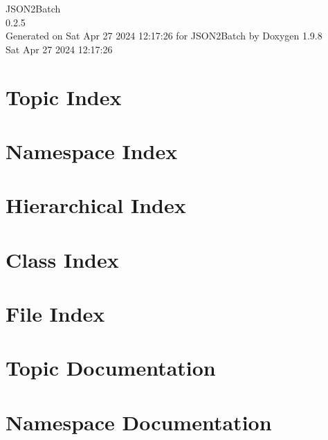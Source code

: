 \documentclass[twoside]{book}
\newcommand{\+}{\discretionary{\mbox{\scriptsize$\hookleftarrow$}}{}{}}
\newcommand{\clearemptydoublepage}{%
    \newpage{\pagestyle{empty}\cleardoublepage}%
  }
\begin{document}
  \raggedbottom
    \hypersetup{pageanchor=false,
                bookmarksnumbered=true,
                pdfencoding=unicode
               }
  \begin{titlepage}
  \vspace*{7cm}
  \begin{center}%
  {\Large JSON2\+Batch}\\
  [1ex]\large 0.\+2.\+5 \\
  \vspace*{1cm}
  {\large Generated on Sat Apr 27 2024 12\+:17\+:26 for JSON2\+Batch by Doxygen 1.9.8}\\
    \vspace*{0.5cm}
    {\small Sat Apr 27 2024 12:17:26}
  \end{center}
  \end{titlepage}
  \clearemptydoublepage
  \tableofcontents
  \clearemptydoublepage
  \hypersetup{pageanchor=true}

\chapter{Topic Index}

\chapter{Namespace Index}

\chapter{Hierarchical Index}

\chapter{Class Index}

\chapter{File Index}

\chapter{Topic Documentation}

\chapter{Namespace Documentation}





\end{document}
